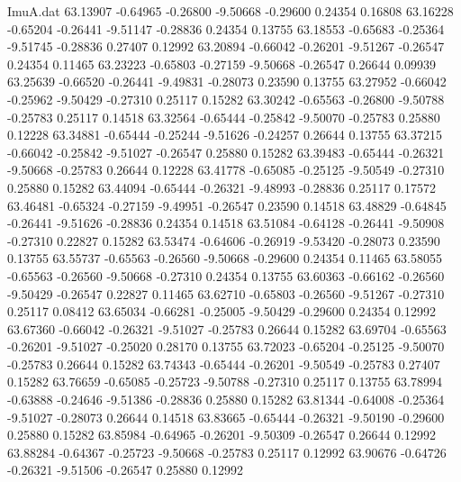\begin{filecontents}{ImuA.dat}
  63.13907   -0.64965   -0.26800   -9.50668   -0.29600    0.24354    0.16808
  63.16228   -0.65204   -0.26441   -9.51147   -0.28836    0.24354    0.13755
  63.18553   -0.65683   -0.25364   -9.51745   -0.28836    0.27407    0.12992
  63.20894   -0.66042   -0.26201   -9.51267   -0.26547    0.24354    0.11465
  63.23223   -0.65803   -0.27159   -9.50668   -0.26547    0.26644    0.09939
  63.25639   -0.66520   -0.26441   -9.49831   -0.28073    0.23590    0.13755
  63.27952   -0.66042   -0.25962   -9.50429   -0.27310    0.25117    0.15282
  63.30242   -0.65563   -0.26800   -9.50788   -0.25783    0.25117    0.14518
  63.32564   -0.65444   -0.25842   -9.50070   -0.25783    0.25880    0.12228
  63.34881   -0.65444   -0.25244   -9.51626   -0.24257    0.26644    0.13755
  63.37215   -0.66042   -0.25842   -9.51027   -0.26547    0.25880    0.15282
  63.39483   -0.65444   -0.26321   -9.50668   -0.25783    0.26644    0.12228
  63.41778   -0.65085   -0.25125   -9.50549   -0.27310    0.25880    0.15282
  63.44094   -0.65444   -0.26321   -9.48993   -0.28836    0.25117    0.17572
  63.46481   -0.65324   -0.27159   -9.49951   -0.26547    0.23590    0.14518
  63.48829   -0.64845   -0.26441   -9.51626   -0.28836    0.24354    0.14518
  63.51084   -0.64128   -0.26441   -9.50908   -0.27310    0.22827    0.15282
  63.53474   -0.64606   -0.26919   -9.53420   -0.28073    0.23590    0.13755
  63.55737   -0.65563   -0.26560   -9.50668   -0.29600    0.24354    0.11465
  63.58055   -0.65563   -0.26560   -9.50668   -0.27310    0.24354    0.13755
  63.60363   -0.66162   -0.26560   -9.50429   -0.26547    0.22827    0.11465
  63.62710   -0.65803   -0.26560   -9.51267   -0.27310    0.25117    0.08412
  63.65034   -0.66281   -0.25005   -9.50429   -0.29600    0.24354    0.12992
  63.67360   -0.66042   -0.26321   -9.51027   -0.25783    0.26644    0.15282
  63.69704   -0.65563   -0.26201   -9.51027   -0.25020    0.28170    0.13755
  63.72023   -0.65204   -0.25125   -9.50070   -0.25783    0.26644    0.15282
  63.74343   -0.65444   -0.26201   -9.50549   -0.25783    0.27407    0.15282
  63.76659   -0.65085   -0.25723   -9.50788   -0.27310    0.25117    0.13755
  63.78994   -0.63888   -0.24646   -9.51386   -0.28836    0.25880    0.15282
  63.81344   -0.64008   -0.25364   -9.51027   -0.28073    0.26644    0.14518
  63.83665   -0.65444   -0.26321   -9.50190   -0.29600    0.25880    0.15282
  63.85984   -0.64965   -0.26201   -9.50309   -0.26547    0.26644    0.12992
  63.88284   -0.64367   -0.25723   -9.50668   -0.25783    0.25117    0.12992
  63.90676   -0.64726   -0.26321   -9.51506   -0.26547    0.25880    0.12992

\end{filecontents}
